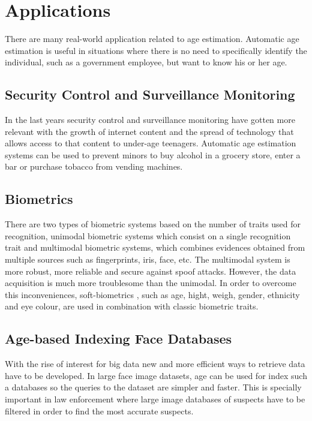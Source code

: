 \section{Applications}
There are many real-world application related to age estimation. Automatic age estimation is useful in situations where there is no need to specifically identify the individual, such as a government employee, but want to know his or her age.

\subsection{Security Control and Surveillance Monitoring}
In the last years security control and surveillance monitoring have gotten more relevant with the growth of internet content and the spread of technology that allows access to that content to under-age teenagers. Automatic age estimation systems can be used to prevent minors to buy alcohol in a grocery store, enter a bar or purchase tobacco from vending machines.

\subsection{Biometrics}
There are two types of biometric systems based on the number of traits used for recognition, unimodal biometric systems which consist on a single recognition trait and multimodal biometric systems, which combines evidences obtained from multiple sources \cite{MSU-CSE-99-39} such as fingerprints, iris, face, etc. The multimodal system is more robust, more reliable and secure against spoof attacks. However, the data acquisition is much more troublesome than the unimodal. In order to overcome this inconveniences, soft-biometrics \cite{conf/icba/JainDN04}, such as age, hight, weigh, gender, ethnicity and eye colour, are used in combination with classic biometric traits. 

\subsection{Age-based Indexing Face Databases}
With the rise of interest for big data new and more efficient ways to retrieve data have to be developed. In large face image datasets, age can be used for index such a databases so the queries to the dataset are simpler and faster. This is specially important in law enforcement where large image databases of suspects have to be filtered in order to find the most accurate suspects.

